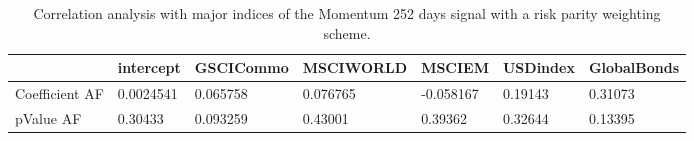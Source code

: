 \begin{table}[H]
\centering
\begin{tabular}{lllllll}
& intercept & GSCICommo & MSCIWORLD & MSCIEM & USDindex & GlobalBonds \\ 
\hline 
Coefficient AF & 0.0024541 & 0.065758 & 0.076765 & -0.058167 & 0.19143 & 0.31073 \\ 
pValue AF & 0.30433 & 0.093259 & 0.43001 & 0.39362 & 0.32644 & 0.13395 \\ 
\hline
\end{tabular}
\caption{Correlation analysis with major indices of the Momentum 252 days signal with a risk parity weighting scheme.}
\label{MOM252RP_AFACTOR}
\end{table}